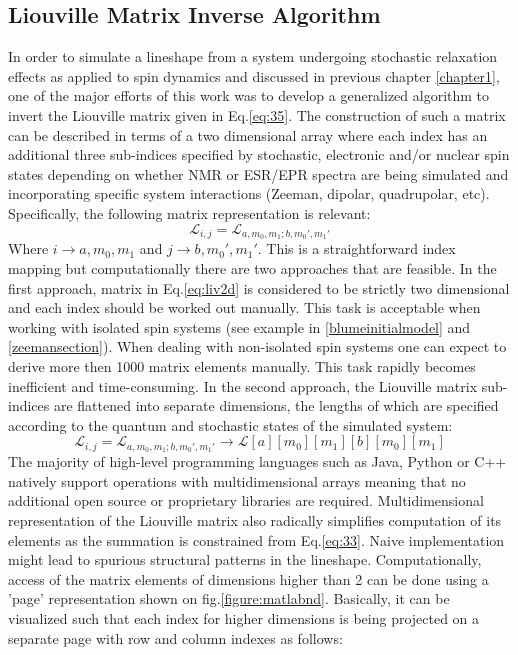 \subsection{Liouville Matrix Inverse Algorithm}\label{algorithmsection}
In order to simulate a lineshape from a system undergoing stochastic relaxation effects as applied to spin dynamics and discussed in previous chapter \ref{chapter1},  one of the major efforts of this work was to develop a generalized algorithm to invert the Liouville matrix given in Eq.\ref{eq:35}. The construction of such a matrix can be described in terms of a two dimensional array where each index has an additional three sub-indices specified by stochastic, electronic and/or nuclear spin states depending on whether NMR or ESR/EPR spectra are being simulated and incorporating specific system interactions (Zeeman, dipolar, quadrupolar, etc). Specifically, the following matrix representation is relevant: 
\begin{equation}\label{eq:liv2d}
\mathcal{L}_{i,j}=\mathcal{L}_{a,m_0,m_1;b,m_0',m_1'}  
\end{equation}  
Where $i\rightarrow a,m_0,m_1$ and $j\rightarrow b,m_0',m_1'$. This is a straightforward index mapping but computationally there are two approaches that are feasible. In the first approach, matrix in Eq.\ref{eq:liv2d} is considered to be strictly two dimensional and each index should be worked out manually. This task is acceptable when working with isolated spin systems (see example in \ref{blumeinitialmodel} and \ref{zeemansection}). When dealing with non-isolated spin systems one can expect to derive more then 1000 matrix elements manually. This task rapidly becomes inefficient and time-consuming. In the second approach, the Liouville matrix sub-indices are flattened into separate dimensions, the lengths of which are specified according to the quantum and stochastic states of the simulated system:  
\begin{equation}\label{eq:54}
\mathcal{L}_{i,j}=\mathcal{L}_{a,m_0,m_1;b,m_0',m_1'}\rightarrow \mathcal{L}[a][m_0][m_1][b][m_0][m_1]
\end{equation}
The majority of high-level programming languages such as Java, Python or C++ natively support operations with multidimensional arrays meaning that no additional open source or proprietary libraries are required. Multidimensional representation of the Liouville matrix also radically simplifies computation of its elements as the summation is constrained from Eq.\ref{eq:33}. Naive implementation might lead to spurious structural patterns in the lineshape. Computationally, access of the matrix elements of dimensions higher than 2 can be done using a 'page' representation shown on fig.\ref{figure:matlabnd}. Basically, it can be visualized such that each index for higher dimensions is being projected on a separate page with row and column indexes as follows: 

